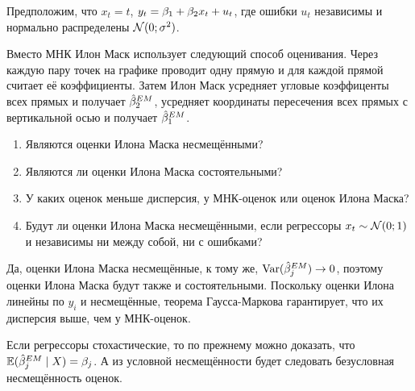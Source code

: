 \begin{problem}
  Предположим, что $x_t = t$, $y_t = \beta_1 + \beta_2 x_t + u_t$, 
  где ошибки $u_t$ независимы и нормально распределены $\mathcal{N}(0; \sigma^2)$.

  Вместо МНК Илон Маск использует следующий способ оценивания. 
  Через каждую пару точек на графике проводит одну прямую и для каждой прямой считает 
  её коэффициенты.
  Затем Илон Маск усредняет угловые коэффиценты всех прямых и получает $\hat{\beta}_2^{EM}$, 
  усредняет координаты пересечения всех прямых с вертикальной осью и получает $\hat{\beta}_{1}^{EM}$.

\begin{enumerate}
  \item Являются оценки Илона Маска несмещёнными?
  \item Являются ли оценки Илона Маска состоятельными?
  \item У каких оценок меньше дисперсия, у МНК-оценок или оценок Илона Маска?
  \item Будут ли оценки Илона Маска несмещёнными, 
  если регрессоры $x_t \sim \mathcal{N}(0; 1)$ и независимы ни между собой, ни с ошибками?
\end{enumerate}

\begin{sol}
  Да, оценки Илона Маска несмещённые, к тому же, $\operatorname{Var}(\hat{\beta}_j^{EM}) \rightarrow 0$, 
  поэтому оценки Илона Маска будут также и состоятельными. 
  Поскольку оценки Илона линейны по $y_i$ и несмещённые, 
  теорема Гаусса-Маркова гарантирует, что их дисперсия выше, чем у МНК-оценок. 

  Если регрессоры стохастические, то по прежнему можно доказать, что $\mathbb{E}(\hat{\beta}_j^{EM} \mid X) = \beta_j$.
  А из условной несмещённости будет следовать безусловная несмещённость оценок. 
\end{sol}
\end{problem}





